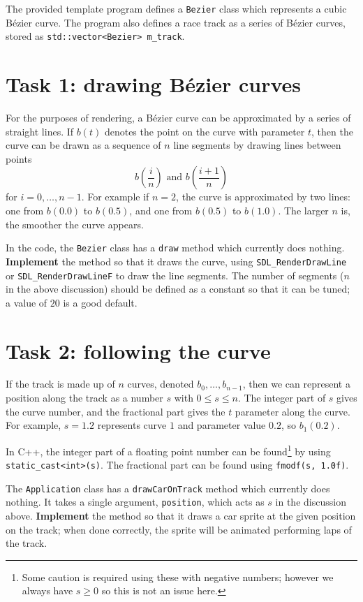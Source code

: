 \documentclass{../../../fal_assignment}
\begin{document}
The provided template program defines a \lstinline{Bezier} class which represents a cubic B\'ezier curve.
The program also defines a race track as a series of B\'ezier curves,
stored as \lstinline{std::vector<Bezier> m_track}.

\section*{Task 1: drawing B\'ezier curves}

For the purposes of rendering, a B\'ezier curve can be approximated by a series of straight lines.
If $b(t)$ denotes the point on the curve with parameter $t$,
then the curve can be drawn as a sequence of $n$ line segments by drawing lines between points
$$ b\left(\frac{i}{n}\right) \text{ and } b\left(\frac{i+1}{n}\right) $$
for $i = 0, \dots, n-1$. For example if $n=2$, the curve is approximated by two lines: one from $b(0.0)$ to $b(0.5)$, and one from $b(0.5)$ to $b(1.0)$. The larger $n$ is, the smoother the curve appears.

In the code, the \lstinline{Bezier} class has a \lstinline{draw} method which currently does nothing.
\textbf{Implement} the method so that it draws the curve, using \lstinline{SDL_RenderDrawLine} or \lstinline{SDL_RenderDrawLineF} to draw the line segments. The number of segments ($n$ in the above discussion) should be defined as a constant so that it can be tuned; a value of $20$ is a good default.

\section*{Task 2: following the curve}

If the track is made up of $n$ curves, denoted $b_0, \dots, b_{n-1}$, then we can represent a position
along the track as a number $s$ with $0 \leq s \leq n$.
The integer part of $s$ gives the curve number, and the fractional part gives the $t$ parameter along the curve. For example, $s=1.2$ represents curve $1$ and parameter value $0.2$, so $b_1(0.2)$.

In C++, the integer part of a floating point number can be found\footnote{Some caution is required using these with negative numbers; however we always have $s \geq 0$ so this is not an issue here.} by using \lstinline{static_cast<int>(s)}.
The fractional part can be found using \lstinline{fmodf(s, 1.0f)}.

The \lstinline{Application} class has a \lstinline{drawCarOnTrack} method which currently does nothing.
It takes a single argument, \lstinline{position}, which acts as $s$ in the discussion above.
\textbf{Implement} the method so that it draws a car sprite at the given position on the track;
when done correctly, the sprite will be animated performing laps of the track.
\end{document}
